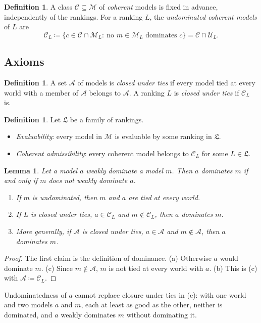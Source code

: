 \documentclass[11pt]{article}
\newtheorem{lemma}[theorem]{Lemma}
\theoremstyle{definition}
\newtheorem{definition}[theorem]{Definition}
\newcommand{\M}{\mathcal M}
\newcommand{\C}{\mathcal C}
\newcommand{\U}{\mathcal U}
\newcommand{\Lf}{\mathfrak L}
\begin{document}
\begin{definition}\label{def:coherence-property}
A class $\C\subseteq\M$ of \emph{coherent} models is fixed in advance, independently of the rankings. For a ranking $L$, the \emph{undominated coherent models} of $L$ are
\[
\C_L\coloneqq\{c\in\C\cap\M_L:\ \text{no } m\in\M_L \text{ dominates } c\}=\C\cap\U_L.
\]
\end{definition}

\subsection{Axioms}

\begin{definition}\label{def:tie-closure}
A set $\mathcal A$ of models is \emph{closed under ties} if every model tied at every world with a member of $\mathcal A$ belongs to $\mathcal A$. A ranking $L$ is \emph{closed under ties} if $\C_L$ is.
\end{definition}

\begin{definition}\label{def:family-assumptions}
Let $\Lf$ be a family of rankings.
\begin{itemize}[leftmargin=*]
\item \emph{Evaluability}: every model in $\M$ is evaluable by some ranking in $\Lf$.
\item \emph{Coherent admissibility}: every coherent model belongs to $\C_L$ for some $L\in\Lf$.
\end{itemize}
\end{definition}

\begin{lemma}\label{lem:ties}
Let a model $a$ weakly dominate a model $m$. Then $a$ dominates $m$ if and only if $m$ does not weakly dominate $a$.
\begin{enumerate}[label=(\alph*)]
\item If $m$ is undominated, then $m$ and $a$ are tied at every world.
\item If $L$ is closed under ties, $a\in\C_L$ and $m\notin\C_L$, then $a$ dominates $m$.
\item More generally, if $\mathcal A$ is closed under ties, $a\in\mathcal A$ and $m\notin\mathcal A$, then $a$ dominates $m$.
\end{enumerate}
\end{lemma}
\begin{proof}
The first claim is the definition of dominance. (a) Otherwise $a$ would dominate $m$. (c) Since $m\notin\mathcal A$, $m$ is not tied at every world with $a$. (b) This is (c) with $\mathcal A\coloneqq\C_L$.
\end{proof}
Undominatedness of $a$ cannot replace closure under ties in (c): with one world and two models $a$ and $m$, each at least as good as the other, neither is dominated, and $a$ weakly dominates $m$ without dominating it.
\end{document}
